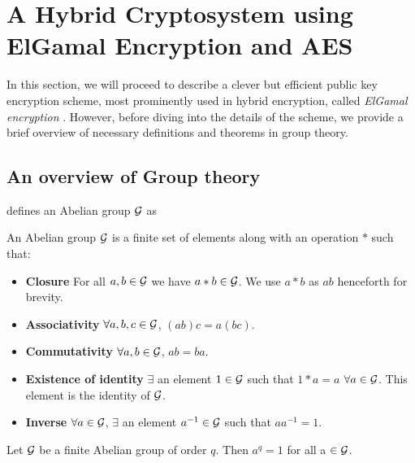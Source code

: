 \section{A Hybrid Cryptosystem using ElGamal Encryption and AES}

\label{sec:elgamal} 

In this section, we will proceed to describe a clever but efficient public key encryption scheme, most prominently used in hybrid encryption, called \textit{ElGamal encryption} \cite{Elgamal_1985}. 
However, before diving into the details of the scheme, we provide a brief overview of necessary definitions and theorems in group theory.

\subsection{An overview of Group theory}

\cite{koocmsc} defines an Abelian group $ \mathcal{G} $ as

\begin{definition}
An Abelian group $ \mathcal{G} $ is a finite set of elements along with an operation $ * $ such that:

\begin{itemize}
    \item \textbf{Closure} For all $ a, b \in \mathcal{G} $ we have $ a * b \in \mathcal{G} $. We use $ a * b $ as $ ab $ henceforth for brevity.
    \item \textbf{Associativity} $ \forall a, b, c \in \mathcal{G} $, $ (ab)c = a(bc) $.
    \item \textbf{Commutativity} $ \forall a, b \in \mathcal{G} $, $ ab = ba $.
    \item \textbf{Existence of identity} $ \exists $ an element $ 1 \in \mathcal{G} $ such that $ 1 * a = a $ $ \forall a \in \mathcal{G} $. This element is the identity of $ \mathcal{G} $.
    \item \textbf{Inverse} $ \forall a \in \mathcal{G}$, $ \exists $ an element $ a^{-1} \in \mathcal{G} $ such that $ aa^{-1} = 1 $.
\end{itemize}
\end{definition}

\begin{theorem}
Let $\mathcal{G}$ be a finite Abelian group of order $ q $. Then $ a^q = 1 $ for all a $\in \mathcal{G}$.
\end{theorem}

